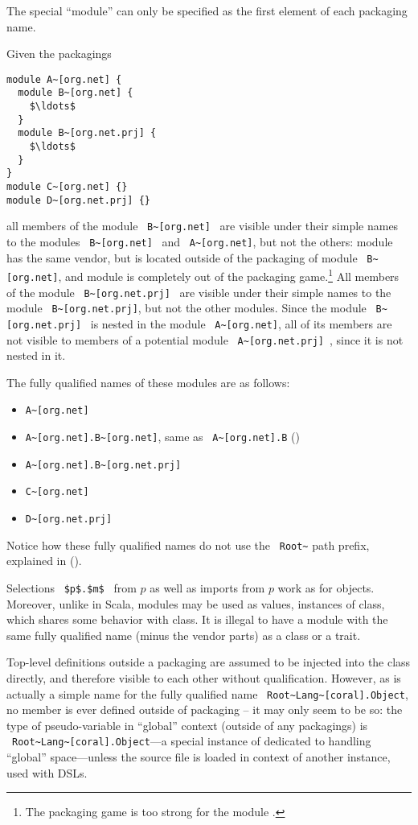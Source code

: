 The special  ``module'' can only be specified as the first element of each packaging name. 

\example Given the packagings
\begin{lstlisting}
module A~[org.net] {
  module B~[org.net] {
    $\ldots$
  }
  module B~[org.net.prj] {
    $\ldots$
  }
}
module C~[org.net] {}
module D~[org.net.prj] {}
\end{lstlisting}
all members of the module ~\lstinline!B~[org.net]!~ are visible under their simple names to the modules ~\lstinline!B~[org.net]!~ and ~\lstinline!A~[org.net]!, but not the others: module  has the same vendor, but is located outside of the packaging of module ~\lstinline!B~[org.net]!, and module  is completely out of the packaging game.\footnote{The packaging game is too strong for the module .} All members of the module ~\lstinline!B~[org.net.prj]!~ are visible under their simple names to the module ~\lstinline!B~[org.net.prj]!, but not the other modules. Since the module ~\lstinline!B~[org.net.prj]!~ is nested in the module ~\lstinline!A~[org.net]!, all of its members are not visible to members of a potential module ~\lstinline!A~[org.net.prj]!~, since it is not nested in it. 

The fully qualified names of these modules are as follows: 
\begin{itemize}
\item \lstinline!A~[org.net]!
\item \lstinline!A~[org.net].B~[org.net]!, same as ~\lstinline!A~[org.net].B! ()
\item \lstinline!A~[org.net].B~[org.net.prj]!
\item \lstinline!C~[org.net]!
\item \lstinline!D~[org.net.prj]!
\end{itemize}

Notice how these fully qualified names do not use the ~\lstinline!Root~! path prefix, explained in ().

Selections ~\lstinline!$p$.$m$!~ from $p$ as well as imports from $p$ work as for objects. Moreover, unlike in Scala, modules may be used as values, instances of  class, which shares some behavior with  class. It is illegal to have a module with the same fully qualified name (minus the vendor parts) as a class or a trait. 

Top-level definitions outside a packaging are assumed to be injected into the  class directly, and therefore visible to each other without qualification. However, as  is actually a simple name for the fully qualified name ~\lstinline!Root~Lang~[coral].Object!, no member is ever defined outside of packaging -- it may only seem to be so: the type of  pseudo-variable in ``global'' context (outside of any packagings) is ~\lstinline!Root~Lang~[coral].Object!---a special instance of  dedicated to handling ``global'' space---unless the source file is loaded in context of another instance, used with DSLs. 






